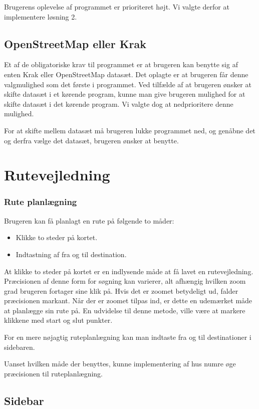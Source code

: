 Brugerens oplevelse af programmet er prioriteret højt. Vi valgte derfor at implementere løsning 2.


\subsection{OpenStreetMap eller Krak}
Et af de obligatoriske krav til programmet er at brugeren kan benytte sig af enten Krak eller OpenStreetMap datasæt. Det oplagte er at brugeren får denne valgmulighed som det første i programmet. Ved tilfælde af at brugeren ønsker at skifte datasæt i et kørende program, kunne man give brugeren mulighed for at skifte datasæt i det kørende program. Vi valgte dog at nedprioritere denne mulighed.

For at skifte mellem datasæt må brugeren lukke programmet ned, og genåbne det og derfra vælge det datasæt, brugeren ønsker at benytte. 


\section{Rutevejledning}

\subsubsection{Rute planlægning}

Brugeren kan få planlagt en rute på følgende to måder:

\begin{itemize}
	\item Klikke to steder på kortet.
	\item  Indtastning af fra og til destination.
\end{itemize}

At klikke to steder på kortet er en indlysende måde at få lavet en rutevejledning. Præcisionen af denne form for søgning kan varierer, alt afhængig hvilken zoom grad brugeren fortager sine klik på. Hvis det er zoomet betydeligt ud, falder præcisionen markant. Når der er zoomet tilpas ind, er dette en udemærket måde at planlægge sin rute på. En udvidelse til denne metode, ville være at markere klikkene med start og slut punkter. 

For en mere nøjagtig ruteplanlægning kan man indtaste fra og til destinationer i sidebaren.

Uanset hvilken måde der benyttes, kunne implementering af hus numre øge præcisionen til ruteplanlægning. 

\subsection{Sidebar}

